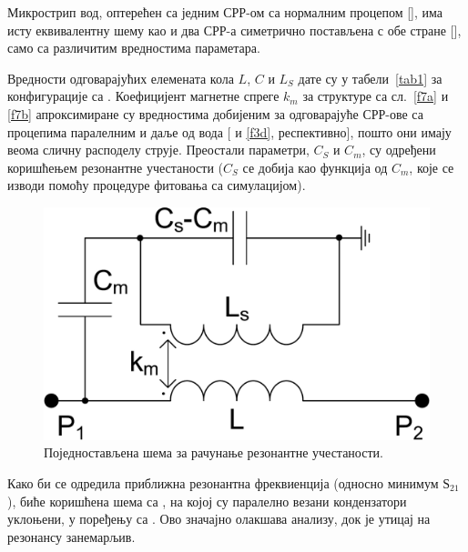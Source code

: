 Микрострип вод, оптерећен са једним СРР-ом са нормалним процепом [], има исту еквивалентну шему као и два СРР-а симетрично постављена с обе стране [], само са различитим вредностима параметара.

Вредности одговарајућих елемената кола $L$, $C$ и $L_S$ дате су у табели~\ref{tab1} за конфигурације са . Коефицијент магнетне спреге $k_m$ за структуре са сл.~\ref{f7a} и \ref{f7b} апроксимиране су вредностима добијеним за одговарајуће СРР-ове са процепима паралелним и даље од вода [ и \ref{f3d}, респективно], пошто они имају веома сличну расподелу струје. Преостали параметри, $C_S$ и $C_m$, су одређени коришћењем резонантне учестаности ($C_S$ се добија као функција од $C_m$, које се изводи помоћу процедуре фитовања са симулацијом).

\begin{figure}[!t]
\centering
\includegraphics[width=0.4\columnwidth]{sl_ekv/fig8}
\caption{Поједностављена шема за рачунање резонантне учестаности.}
\label{f8}
\end{figure}
Како би се одредила приближна резонантна фреквиенција (односно минимум $Ѕ_{21}$), биће коришћена шема са , на којој су паралелно везани кондензатори уклоњени, у поређењу са . Ово значајно олакшава анализу, док је утицај на резонансу занемарљив.

